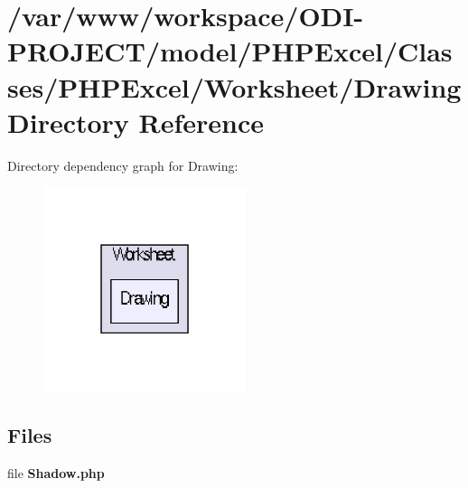 \section{/var/www/workspace/\+O\+D\+I-\/\+P\+R\+O\+J\+E\+C\+T/model/\+P\+H\+P\+Excel/\+Classes/\+P\+H\+P\+Excel/\+Worksheet/\+Drawing Directory Reference}
\label{dir_9404dcfb049f9aeeb6b9a12ac2a69982}
Directory dependency graph for Drawing\+:\nopagebreak
\begin{figure}[H]
\begin{center}
\leavevmode
\includegraphics[width=168pt]{dir_9404dcfb049f9aeeb6b9a12ac2a69982_dep}
\end{center}
\end{figure}
\subsection*{Files}
\begin{DoxyCompactItemize}
\item 
file {\bfseries Shadow.\+php}
\end{DoxyCompactItemize}
